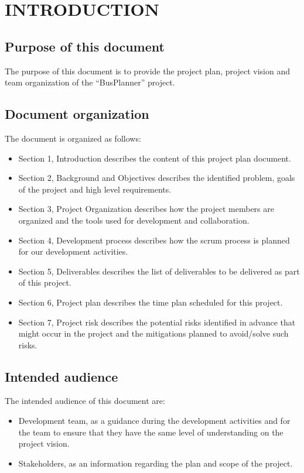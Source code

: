 \section{INTRODUCTION}
\subsection{Purpose of this document}
The purpose of this document is to provide the project plan, project vision and team organization of the “BusPlanner” project. 
\subsection{Document organization}
The document is organized as follows:
\begin{itemize}
	\item Section 1, Introduction describes the content of this project plan document.
	\item Section 2, Background and Objectives describes the identified problem, goals of the project and high level requirements.
	\item Section 3, Project Organization describes how the project members are organized and the tools used for development and collaboration.
	\item Section 4, Development process describes how the scrum process is planned for our development activities.
	\item Section 5, Deliverables describes the list of deliverables to be delivered as part of this project.
	\item Section 6, Project plan describes the time plan scheduled for this project.
	\item Section 7, Project risk describes the potential risks identified in advance that might occur in the project and the mitigations planned to avoid/solve such risks.	
\end{itemize}
\subsection{Intended audience}
The intended audience of this document are:
\begin{itemize}
	\item Development team, as a guidance during the development activities and for the team to ensure that they have the same level of understanding on the project vision.
	\item Stakeholders, as an information regarding the plan and scope of the project.	
\end{itemize}
